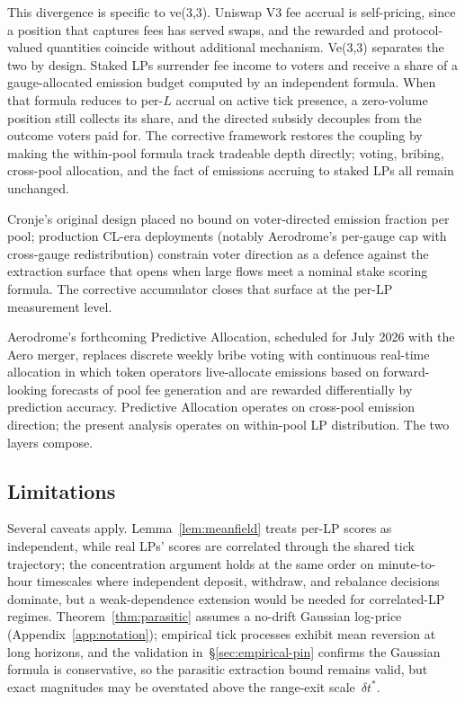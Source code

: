 \documentclass[11pt,a4paper]{article}
\theoremstyle{definition}
\theoremstyle{plain}
\theoremstyle{remark}
\begin{document}
This divergence is specific to ve(3,3). Uniswap V3 fee accrual is self-pricing, since a position that captures fees has served swaps, and the rewarded and protocol-valued quantities coincide without additional mechanism. Ve(3,3) separates the two by design. Staked LPs surrender fee income to voters and receive a share of a gauge-allocated emission budget computed by an independent formula. When that formula reduces to per-$L$ accrual on active tick presence, a zero-volume position still collects its share, and the directed subsidy decouples from the outcome voters paid for. The corrective framework restores the coupling by making the within-pool formula track tradeable depth directly; voting, bribing, cross-pool allocation, and the fact of emissions accruing to staked LPs all remain unchanged.

Cronje's original design\cite{cronje2022} placed no bound on voter-directed emission fraction per pool; production CL-era deployments (notably Aerodrome's per-gauge cap with cross-gauge redistribution) constrain voter direction as a defence against the extraction surface that opens when large flows meet a nominal stake scoring formula. The corrective accumulator closes that surface at the per-LP measurement level.

Aerodrome's forthcoming Predictive Allocation\cite{aerodrome2026pa}, scheduled for July 2026 with the Aero merger, replaces discrete weekly bribe voting with continuous real-time allocation in which token operators live-allocate emissions based on forward-looking forecasts of pool fee generation and are rewarded differentially by prediction accuracy. Predictive Allocation operates on cross-pool emission direction; the present analysis operates on within-pool LP distribution. The two layers compose.

\subsection{Limitations}\label{sec:limitations}

Several caveats apply. Lemma~\ref{lem:meanfield} treats per-LP scores as independent, while real LPs' scores are correlated through the shared tick trajectory; the concentration argument holds at the same order on minute-to-hour timescales where independent deposit, withdraw, and rebalance decisions dominate, but a weak-dependence extension would be needed for correlated-LP regimes. Theorem~\ref{thm:parasitic} assumes a no-drift Gaussian log-price (Appendix~\ref{app:notation}); empirical tick processes exhibit mean reversion at long horizons, and the validation in~\S\ref{sec:empirical-pin} confirms the Gaussian formula is conservative, so the parasitic extraction bound remains valid, but exact magnitudes may be overstated above the range-exit scale~$\delta t^*$.
\end{document}
